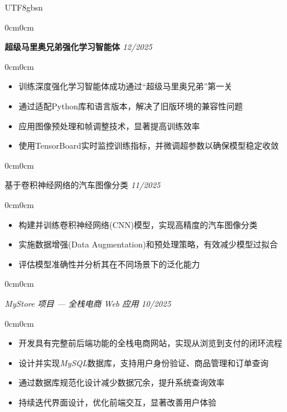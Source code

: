 \documentclass[10pt, letterpaper]{article}
\newenvironment{highlights}{
    \begin{itemize}[topsep=0.1cm,itemsep=0.1cm,leftmargin=12pt]
}{
    \end{itemize}
}
\newenvironment{onecolentry}{
    \begin{adjustwidth}{0cm}{0cm}
}{
    \end{adjustwidth}
}
\begin{document}
\begin{CJK*}{UTF8}{gbsn}
\vspace{0.2cm}

\begin{onecolentry}
\textbf{超级马里奥兄弟强化学习智能体} \hfill \textit{12/2025}
\end{onecolentry}

\begin{onecolentry}
\begin{highlights}
\item 训练深度强化学习智能体成功通过“超级马里奥兄弟”第一关
\item 通过适配Python库和语言版本，解决了旧版环境的兼容性问题
\item 应用图像预处理和帧调整技术，显著提高训练效率
\item 使用TensorBoard实时监控训练指标，并微调超参数以确保模型稳定收敛
\end{highlights}
\end{onecolentry}

\vspace{0.2cm}

\begin{onecolentry}
基于卷积神经网络的汽车图像分类 \hfill \textit{11/2025}
\end{onecolentry}

\begin{onecolentry}
\begin{highlights}
\item 构建并训练卷积神经网络(CNN)模型，实现高精度的汽车图像分类
\item 实施数据增强(Data Augmentation)和预处理策略，有效减少模型过拟合
\item 评估模型准确性并分析其在不同场景下的泛化能力
\end{highlights}
\end{onecolentry}

\vspace{0.2cm}

\begin{onecolentry}
\textit{MyStore 项目 — 全栈电商 Web 应用} \hfill \textit{10/2025}
\end{onecolentry}

\begin{onecolentry}
\begin{highlights}
\item 开发具有完整前后端功能的全栈电商网站，实现从浏览到支付的闭环流程
\item 设计并实现\textit{MySQL}数据库，支持用户身份验证、商品管理和订单查询
\item 通过数据库规范化设计减少数据冗余，提升系统查询效率
\item 持续迭代界面设计，优化前端交互，显著改善用户体验
\end{highlights}
\end{onecolentry}


\end{CJK*}
\end{document}
